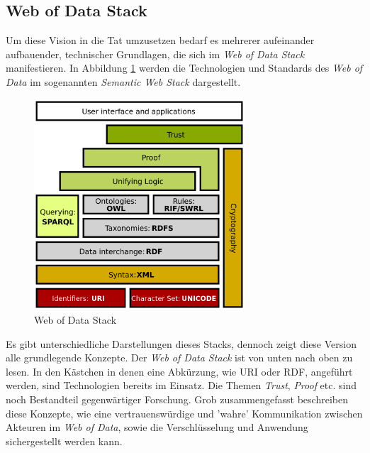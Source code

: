\documentclass[12pt,a4paper]{article}
\begin{document}
\newpage
\subsection{Web of Data Stack}

Um diese Vision in die Tat umzusetzen bedarf es mehrerer aufeinander aufbauender, technischer Grundlagen, die sich im \textit{Web of Data Stack} manifestieren.
In Abbildung \ref{fig:webstack} werden die Technologien und Standards des \textit{Web of Data} im sogenannten \textit{Semantic Web Stack} dargestellt.
\begin{figure}[h]
  \centering
	\includegraphics[width=0.7\textwidth]{img/web_stack.png}  
    \caption[Web of Data Stack, en.wikipedia.org/wiki/Semantic\_Web\_Stack, 29.12.2019.]{Web of Data Stack}
  	\label{fig:webstack}
\end{figure}
Es gibt unterschiedliche Darstellungen dieses Stacks, dennoch zeigt diese Version alle grundlegende Konzepte. Der \textit{Web of Data Stack} ist von unten nach oben zu lesen. In den Kästchen in denen eine Abkürzung, wie URI oder RDF, angeführt werden, sind Technologien bereits im Einsatz. Die Themen \textit{Trust}, \textit{Proof} etc. sind noch Bestandteil gegenwärtiger Forschung. Grob zusammengefasst beschreiben diese Konzepte, wie eine vertrauenswürdige und 'wahre' Kommunikation zwischen Akteuren im \textit{Web of Data}, sowie die Verschlüsselung und Anwendung sichergestellt werden kann. 
\\
\\
\end{document}
